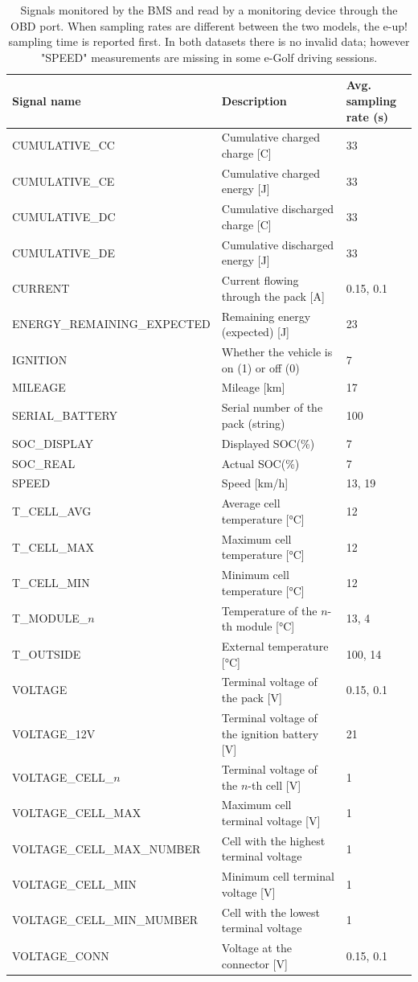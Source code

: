 \begin{table}[htb!]
\scriptsize
\centering
\begin{tabular}[t]{lll}
\toprule
Signal name & Description & \breakcellleft{Avg. sampling\\rate (s)}\\
\midrule
CUMULATIVE\_CC & Cumulative charged charge [C] & 33\\
CUMULATIVE\_CE & Cumulative charged energy [J] & 33\\
CUMULATIVE\_DC & Cumulative discharged charge [C] & 33\\
CUMULATIVE\_DE & Cumulative discharged energy [J] & 33\\
CURRENT & Current flowing through the pack [A] & 0.15, 0.1\\
ENERGY\_REMAINING\_EXPECTED & Remaining energy (expected) [J] & 23\\
IGNITION & Whether the vehicle is on (1) or off (0) & 7\\
MILEAGE & Mileage [km] & 17\\
SERIAL\_BATTERY & Serial number of the pack (string) & 100\\
SOC\_DISPLAY & Displayed SOC(\%) & 7\\
SOC\_REAL & Actual SOC(\%) & 7\\
SPEED & Speed [km/h] & 13, 19\\
T\_CELL\_AVG & Average cell temperature [°C] & 12\\
T\_CELL\_MAX & Maximum cell temperature [°C] & 12\\
T\_CELL\_MIN & Minimum cell temperature [°C] & 12\\
T\_MODULE\_$n$ & Temperature of the $n$-th module [°C] & 13, 4\\
T\_OUTSIDE & External temperature [°C] & 100, 14\\
VOLTAGE & Terminal voltage of the pack [V] & 0.15, 0.1\\
VOLTAGE\_12V & Terminal voltage of the ignition battery [V] & 21\\
VOLTAGE\_CELL\_$n$ & Terminal voltage of the $n$-th cell [V] & 1\\
VOLTAGE\_CELL\_MAX & Maximum cell terminal voltage [V] & 1\\
VOLTAGE\_CELL\_MAX\_NUMBER & Cell with the highest terminal voltage & 1\\
VOLTAGE\_CELL\_MIN & Minimum cell terminal voltage [V] & 1\\
VOLTAGE\_CELL\_MIN\_MUMBER & Cell with the lowest terminal voltage & 1\\
VOLTAGE\_CONN & Voltage at the connector [V] & 0.15, 0.1\\
\bottomrule
\end{tabular}
\caption[Signals monitored by the BMS]{Signals monitored by the BMS and read by a monitoring device through the OBD port. When sampling rates are different between the two models, the e-up! sampling time is reported first. In both datasets there is no invalid data; however "SPEED" measurements are missing in some e-Golf driving sessions.}
\label{tab:aviloo_signals}
\end{table}

